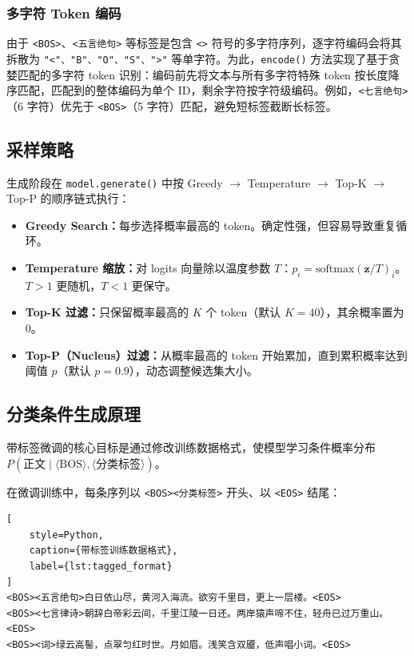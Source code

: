 \documentclass[a4paper, 12pt, centering, AutoFakeBold]{article}
\begin{document}
\subsubsection{多字符 Token 编码}

由于 \texttt{<BOS>}、\texttt{<五言绝句>} 等标签是包含 \texttt{<>} 符号的多字符序列，逐字符编码会将其拆散为 \texttt{"<"、"B"、"O"、"S"、">"} 等单字符。为此，\texttt{encode()} 方法实现了基于贪婪匹配的多字符 token 识别：编码前先将文本与所有多字符特殊 token 按长度降序匹配，匹配到的整体编码为单个 ID，剩余字符按字符级编码。例如，\texttt{<七言绝句>}（6 字符）优先于 \texttt{<BOS>}（5 字符）匹配，避免短标签截断长标签。

\subsection{采样策略}

生成阶段在 \texttt{model.generate()} 中按 Greedy $\to$ Temperature $\to$ Top-K $\to$ Top-P 的顺序链式执行：

\begin{itemize}
    \item \textbf{Greedy Search：}每步选择概率最高的 token。确定性强，但容易导致重复循环。
    \item \textbf{Temperature 缩放：}对 logits 向量除以温度参数 $T$：$p_i = \text{softmax}(\mathbf{z} / T)_i$。$T>1$ 更随机，$T<1$ 更保守。
    \item \textbf{Top-K 过滤：}只保留概率最高的 $K$ 个 token（默认 $K=40$），其余概率置为 0。
    \item \textbf{Top-P（Nucleus）过滤：}从概率最高的 token 开始累加，直到累积概率达到阈值 $p$（默认 $p=0.9$），动态调整候选集大小。
\end{itemize}

\subsection{分类条件生成原理}

带标签微调的核心目标是通过修改训练数据格式，使模型学习条件概率分布 $P(\text{正文}\mid\langle\text{BOS}\rangle, \langle\text{分类标签}\rangle)$。

在微调训练中，每条序列以 \texttt{<BOS><分类标签>} 开头、以 \texttt{<EOS>} 结尾：

\begin{lstlisting}[
    style=Python,
    caption={带标签训练数据格式},
    label={lst:tagged_format}
]
<BOS><五言绝句>白日依山尽，黄河入海流。欲穷千里目，更上一层楼。<EOS>
<BOS><七言律诗>朝辞白帝彩云间，千里江陵一日还。两岸猿声啼不住，轻舟已过万重山。<EOS>
<BOS><词>绿云高髻，点翠匀红时世。月如眉。浅笑含双靥，低声唱小词。<EOS>
\end{lstlisting}
\end{document}
